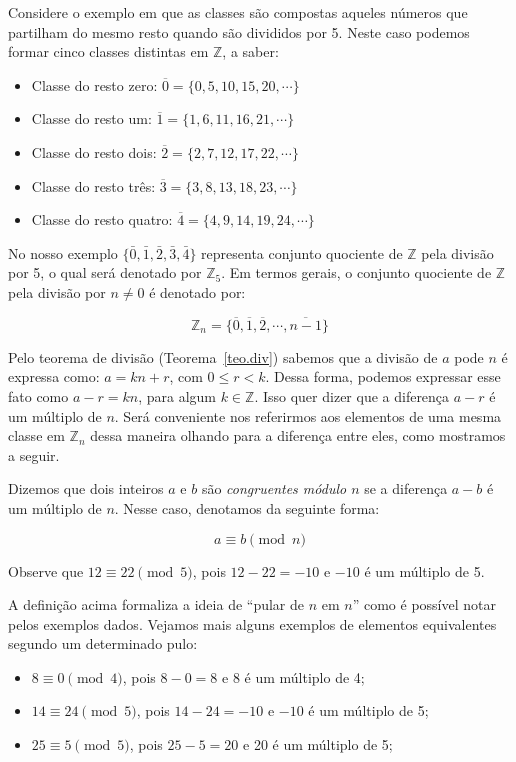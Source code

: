 	Considere o exemplo em que as classes s\~{a}o compostas aqueles n\'{u}meros que partilham do mesmo resto quando s\~{a}o divididos por 
	5. Neste caso podemos formar cinco classes distintas em $\mathbb{Z}$, a saber:
	\begin{itemize}
		\item Classe do resto zero: $\overline{0}=\{0, 5, 10, 15, 20, \cdots\}$
		\item Classe do resto um: $\overline{1}=\{1, 6, 11, 16, 21, \cdots\}$
		\item Classe do resto dois: $\overline{2}=\{2, 7, 12, 17, 22, \cdots\}$
		\item Classe do resto tr\^{e}s: $\overline{3}=\{3, 8, 13, 18, 23, \cdots\}$
		\item Classe do resto quatro: $\overline{4}=\{4, 9, 14, 19, 24, \cdots\}$
	\end{itemize}

	
	No nosso exemplo $\{\bar{0}, \bar{1}, \bar{2}, \bar{3}, \bar{4}\}$ representa conjunto quociente 
	de $\mathbb{Z}$ pela divis\~{a}o por 5, o qual ser\'{a} denotado por $\mathbb{Z}_{5}$. Em termos gerais, 
	o conjunto quociente de $\mathbb{Z}$ pela divis\~{a}o por $n\neq 0$ \'{e} denotado por:

	$$\mathbb{Z}_{n}=\{\overline{0}, \overline{1}, \overline{2}, \cdots, \overline{n-1}\}$$ 

Pelo teorema de divis\~{a}o (Teorema~\ref{teo.div}) sabemos que a divis\~{a}o de $a$ pode $n$ \'{e} expressa como:
$a=kn+r$, com $0\leq r< k$. Dessa forma, podemos expressar esse fato como $a-r=kn$, para algum $k\in\mathbb{Z}$. Isso 
quer dizer que a diferen\c{c}a $a-r$ \'{e} um m\'{u}ltiplo de $n$. Ser\'{a} conveniente nos referirmos aos elementos 
de uma mesma classe em $\mathbb{Z}_{n}$ dessa maneira olhando para a diferen\c{c}a entre eles, como mostramos a seguir. 
   
Dizemos que dois inteiros $a$ e $b$ s\~{a}o \textit{congruentes m\'{o}dulo $n$} se a diferen\c{c}a $a-b$ \'{e} um 
m\'{u}ltiplo de $n$. Nesse caso, denotamos da seguinte forma:

$$a \equiv b \pmod{n}$$ 

Observe que $12 \equiv 22 \pmod{5}$, pois $12-22=-10$ e $-10$ \'{e} um m\'{u}ltiplo de 5. 

A defini\c{c}\~{a}o acima formaliza a ideia de ``pular de $n$ em $n$'' como \'{e} poss\'{i}vel notar 
pelos exemplos dados. Vejamos mais alguns exemplos de elementos equivalentes segundo um determinado pulo:
\begin{itemize}
	\item $8 \equiv 0 \pmod{4}$, pois $8-0=8$ e 8 \'{e} um m\'{u}ltiplo de 4;
	\item $14 \equiv 24  \pmod{5}$, pois $14-24=-10$ e $-10$ \'{e} um m\'{u}ltiplo de 5;
	\item $25 \equiv 5 \pmod{5}$, pois $25-5=20$ e 20 \'{e} um m\'{u}ltiplo de 5;
\end{itemize}

